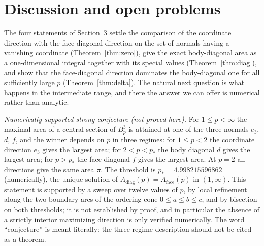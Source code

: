 \documentclass[11pt]{article}
\theoremstyle{plain}
\numberwithin{theorem}{section}
\begin{document}
\section{Discussion and open problems}

The four statements of Section~3 settle the comparison of the coordinate direction with the face-diagonal direction on the set of normals having a vanishing coordinate (Theorem~\ref{thm:zero}), give the exact body-diagonal area as a one-dimensional integral together with its special values (Theorem~\ref{thm:diag}), and show that the face-diagonal direction dominates the body-diagonal one for all sufficiently large $p$ (Theorem~\ref{thm:delta}). The natural next question is what happens in the intermediate range, and there the answer we can offer is numerical rather than analytic.

\emph{Numerically supported strong conjecture (not proved here).} For $1\le p<\infty$ the maximal area of a central section of $B_p^3$ is attained at one of the three normals $e_3$, $d$, $f$, and the winner depends on $p$ in three regimes: for $1\le p<2$ the coordinate direction $e_3$ gives the largest area; for $2<p<p_*$ the body diagonal $d$ gives the largest area; for $p>p_*$ the face diagonal $f$ gives the largest area. At $p=2$ all directions give the same area $\pi$. The threshold is $p_*=4.998215596862$ (numerically), the unique solution of $A_{\mathrm{diag}}(p)=A_{\mathrm{face}}(p)$ in $(1,\infty)$. This statement is supported by a sweep over twelve values of $p$, by local refinement along the two boundary arcs of the ordering cone $0\le a\le b\le c$, and by bisection on both thresholds; it is not established by proof, and in particular the absence of a strictly interior maximizing direction is only verified numerically. The word ``conjecture'' is meant literally: the three-regime description should not be cited as a theorem.
\end{document}

